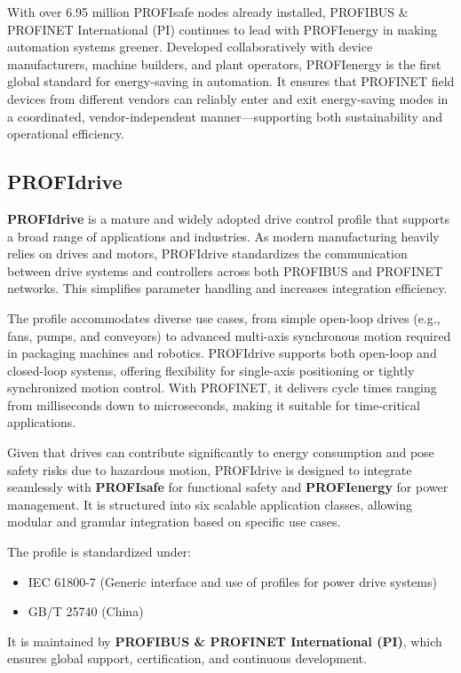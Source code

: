 \documentclass[conference]{IEEEtran}
\begin{document}
With over 6.95 million PROFIsafe nodes already installed, PROFIBUS \& PROFINET International (PI) continues to lead with PROFIenergy in making automation systems greener. Developed collaboratively with device manufacturers, machine builders, and plant operators, PROFIenergy is the first global standard for energy-saving in automation. It ensures that PROFINET field devices from different vendors can reliably enter and exit energy-saving modes in a coordinated, vendor-independent manner—supporting both sustainability and operational efficiency.


\subsection{PROFIdrive}
\label{subsec: PROFIdrive}
\textbf{PROFIdrive} is a mature and widely adopted drive control profile that supports a broad range of applications and industries. As modern manufacturing heavily relies on drives and motors, PROFIdrive standardizes the communication between drive systems and controllers across both PROFIBUS and PROFINET networks. This simplifies parameter handling and increases integration efficiency.

The profile accommodates diverse use cases, from simple open-loop drives (e.g., fans, pumps, and conveyors) to advanced multi-axis synchronous motion required in packaging machines and robotics. PROFIdrive supports both open-loop and closed-loop systems, offering flexibility for single-axis positioning or tightly synchronized motion control. With PROFINET, it delivers cycle times ranging from milliseconds down to microseconds, making it suitable for time-critical applications.

Given that drives can contribute significantly to energy consumption and pose safety risks due to hazardous motion, PROFIdrive is designed to integrate seamlessly with \textbf{PROFIsafe} for functional safety and \textbf{PROFIenergy} for power management. It is structured into six scalable application classes, allowing modular and granular integration based on specific use cases.

The profile is standardized under:
\begin{itemize}
    \item IEC 61800-7 (Generic interface and use of profiles for power drive systems)
    \item GB/T 25740 (China)
\end{itemize}
It is maintained by \textbf{PROFIBUS \& PROFINET International (PI)}, which ensures global support, certification, and continuous development.
\end{document}
